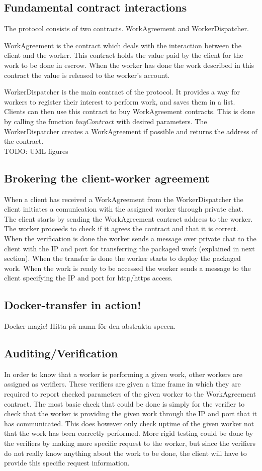 \subsection{Fundamental contract interactions}
The protocol consists of two contracts. WorkAgreement and  WorkerDispatcher.

WorkAgreement is the contract which deals with the interaction between the client and the worker. This contract holds the value paid by the client for the work to be done in escrow. When the worker has done the work described in this contract the value is released to the worker's account.

WorkerDispatcher is the main contract of the protocol. It provides a way for workers to register their interest to perform work, and saves them in a list. Clients can then use this contract to buy WorkAgreement contracts. This is done by calling the function $buyContract$ with desired parameters. The WorkerDispatcher creates a WorkAgreement if possible and returns the address of the contract.
\\TODO: UML figures

\subsection{Brokering the client-worker agreement}
When a client has received a WorkAgreement from the WorkerDispatcher the client initiates a comunication with the assigned worker through private chat. The client starts by sending the WorkAgreement contract address to the worker. The worker proceeds to check if it agrees the contract and that it is correct. When the verification is done the worker sends a message over private chat to the client with the IP and port for transferring the packaged work (explained in next section). When the transfer is done the worker starts to deploy the packaged work. When the work is ready to be accessed the worker sends a message to the client specifying the IP and port for http/https access.

\subsection{Docker-transfer in action!}
Docker magic! Hitta på namn för den abstrakta specen.

\subsection{Auditing/Verification}
In order to know that a worker is performing a given work, other workers are assigned as verifiers. These verifiers are given a time frame in which they are required to report checked parameters of the given worker to the WorkAgreement contract. The most basic check that could be done is simply for the verifier to check that the worker is providing the given work through the IP and port that it has communicated. This does however only check uptime of the given worker not that the work has been correctly performed. More rigid testing could be done by the verifiers by making more specific request to the worker, but since the verifiers do not really know anything about the work to be done, the client will have to provide this specific request information.

